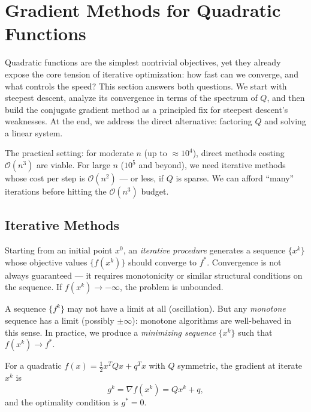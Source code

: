 \section{Gradient Methods for Quadratic Functions}\label{sec:quadratic-methods}

Quadratic functions are the simplest nontrivial objectives, yet they already expose the core tension of iterative optimization: how fast can we converge, and what controls the speed?
This section answers both questions.
We start with steepest descent, analyze its convergence in terms of the spectrum of $Q$, and then build the conjugate gradient method as a principled fix for steepest descent's weaknesses.
At the end, we address the direct alternative: factoring $Q$ and solving a linear system.

The practical setting: for moderate $n$ (up to $\approx 10^4$), direct methods costing $\mathcal{O}(n^3)$ are viable.
For large $n$ ($10^5$ and beyond), we need iterative methods whose cost per step is $\mathcal{O}(n^2)$ --- or less, if $Q$ is sparse.
We can afford ``many'' iterations before hitting the $\mathcal{O}(n^3)$ budget.


\subsection{Iterative Methods}\label{ssec:iterative}

\begin{defn}\label{def:iterative}
	Starting from an initial point $x^0$, an \textit{iterative procedure} generates a sequence $\{x^k\}$ whose objective values $\{f(x^k)\}$ should converge to $f^*$.
	Convergence is not always guaranteed --- it requires monotonicity or similar structural conditions on the sequence.
	If $f(x^k) \to -\infty$, the problem is unbounded.
\end{defn}

A sequence $\{f^k\}$ may not have a limit at all (oscillation).
But any \textit{monotone} sequence has a limit (possibly $\pm\infty$): monotone algorithms are well-behaved in this sense.
In practice, we produce a \textit{minimizing sequence} $\{x^k\}$ such that $f(x^k) \to f^*$.

For a quadratic $f(x) = \frac{1}{2} x^T Q x + q^T x$ with $Q$ symmetric, the gradient at iterate $x^k$ is
\begin{equation}\label{eq:quad-gradient}
	g^k = \nabla f(x^k) = Q x^k + q,
\end{equation}
and the optimality condition is $g^* = 0$.


